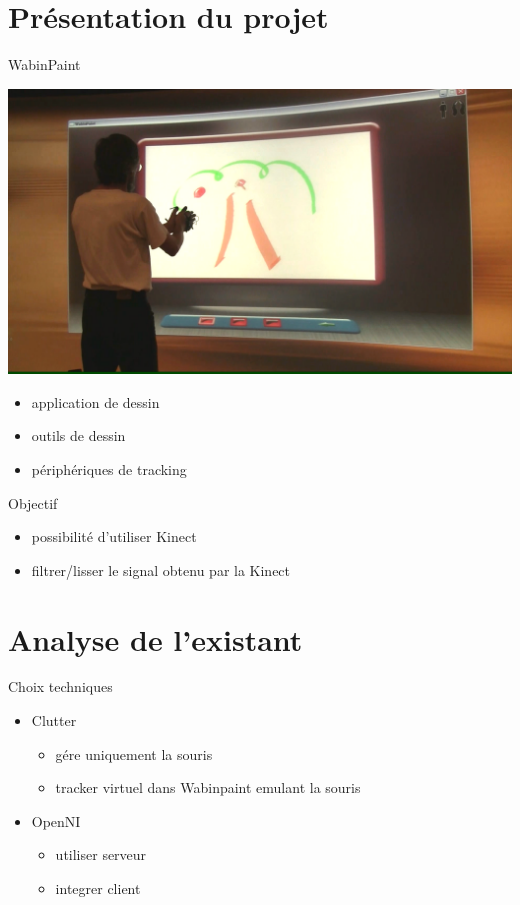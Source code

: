 \documentclass[12pt]{beamer}
\begin{document}
\section{Présentation du projet}

\begin{frame}{WabinPaint}
	\begin{center}
		\includegraphics[scale=0.08]{images/WabinPaint.png}
	\end{center}
	\begin{itemize}
		\item application de dessin
		\item outils de dessin
		\item périphériques de tracking
	\end{itemize}
\end{frame}

\begin{frame}{Objectif}
	\begin{itemize}
		\item possibilité d'utiliser Kinect
		\item filtrer/lisser le signal obtenu par la Kinect		
	\end{itemize}
\end{frame}


\section{Analyse de l'existant}

\begin{frame}{Choix techniques}
	\begin{itemize}
		\item Clutter
			\begin{itemize}
				\item gére uniquement la souris
				\item tracker virtuel dans Wabinpaint emulant la souris
		\end{itemize}
		\item OpenNI
			\begin{itemize}
				\item utiliser serveur
				\item integrer client
		\end{itemize}
	\end{itemize}
\end{frame}
\end{document}
